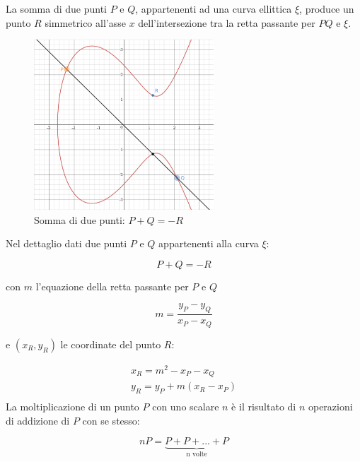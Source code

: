 La somma di due punti $P$ e $Q$, appartenenti ad una curva ellittica $\xi$, produce un punto $R$ simmetrico all'asse $x$ dell'intersezione tra la retta passante per $PQ$ e $\xi$.
\begin{figure}[H]
    \centering
    \includegraphics[width=0.6\textwidth]{images/ECDSA.png}
    \caption{Somma di due punti: $P+Q=-R$}
    \label{fig:ECDSA}
\end{figure}
Nel dettaglio dati due punti $P$ e $Q$ appartenenti alla curva $\xi$:

\begin{equation}
    P + Q = -R
\end{equation}

con $m$ l'equazione della retta passante per $P$ e $Q$

\begin{equation}
    m=\frac{y_P-y_Q}{x_P-x_Q}
\end{equation}

e $(x_R,y_R)$ le coordinate del punto $R$:

\begin{equation}
    \begin{split}
        x_R = m^2 - x_P - x_Q\\
        y_R = y_P + m(x_R - x_P)\\
    \end{split}
\end{equation}
La moltiplicazione di un punto $P$ con uno scalare $n$ è il risultato di $n$ operazioni di addizione di $P$ con se stesso:

\begin{equation}
    nP = \underbrace{P + P + ... + P}_\text{n volte}
\end{equation}

